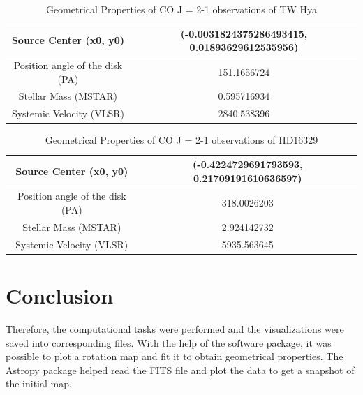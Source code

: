 \documentclass{article}
\begin{document}
\begin{table}[ht]
\centering
\begin{tabular}{ |c|c| }
 \hline
 Source Center (x0, y0) & (-0.0031824375286493415, 0.01893629612535956) \\ 
 \hline
 Position angle of the disk (PA) & 151.1656724 \\ 
 \hline
  Stellar Mass (MSTAR) & 0.595716934 \\ 
 \hline
   Systemic Velocity (VLSR) & 2840.538396 \\ 
 \hline
\end{tabular}
\caption{Geometrical Properties of CO J = 2-1 observations of TW Hya}
\label{tab:table 1}
\end{table}

\begin{table}[ht]
\centering
\begin{tabular}{ |c|c| }
 \hline
 Source Center (x0, y0) & (-0.4224729691793593, 0.21709191610636597) \\ 
 \hline
 Position angle of the disk (PA) & 318.0026203 \\ 
 \hline
  Stellar Mass (MSTAR) & 2.924142732 \\ 
 \hline
   Systemic Velocity (VLSR) & 5935.563645 \\ 
 \hline
\end{tabular}
\caption{Geometrical Properties of CO J = 2-1 observations of HD16329}
\label{tab:table 2}
\end{table}

\section{Conclusion}
Therefore, the computational tasks were performed and the visualizations were saved into corresponding files. With the help of the software package, it was possible to plot a rotation map and fit it to obtain geometrical properties. The Astropy package helped read the FITS file and plot the data to get a snapshot of the initial map. 


\end{document}
